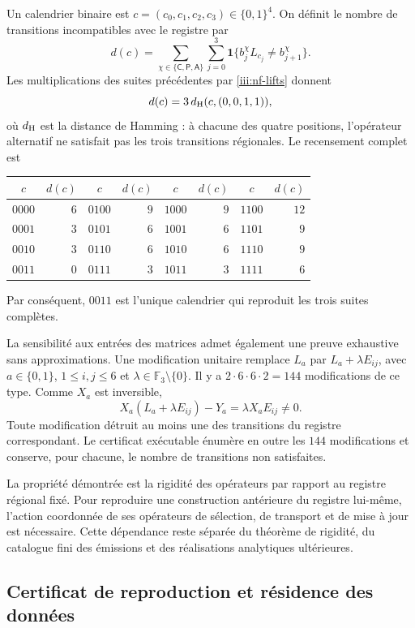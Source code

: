 Un calendrier binaire est $c=(c_0,c_1,c_2,c_3)\in\{0,1\}^4$.
On définit le nombre de transitions incompatibles avec le registre par
\begin{equation}
 d(c)=\sum_{\chi\in\{\mathsf C,\mathsf P,\mathsf A\}}
       \sum_{j=0}^{3}
       \mathbf1\{b_j^\chi L_{c_j}\ne b_{j+1}^\chi\}.
 \label{iii:nf-calendario}
\end{equation}
Les multiplications des suites précédentes par
\eqref{iii:nf-lifts} donnent
\[
 d(c)=3\,d_{\rm H}(c,(0,0,1,1)),
\]
où $d_{\rm H}$ est la distance de Hamming : à chacune des
quatre positions, l’opérateur alternatif ne satisfait pas les trois
transitions régionales. Le recensement complet est
\begin{center}
\begin{tabular}{cr@{\qquad}cr@{\qquad}cr@{\qquad}cr}
$c$&$d(c)$&$c$&$d(c)$&$c$&$d(c)$&$c$&$d(c)$\\ \hline
$0000$&$6$&$0100$&$9$&$1000$&$9$&$1100$&$12$\\
$0001$&$3$&$0101$&$6$&$1001$&$6$&$1101$&$9$\\
$0010$&$3$&$0110$&$6$&$1010$&$6$&$1110$&$9$\\
$0011$&$0$&$0111$&$3$&$1011$&$3$&$1111$&$6$
\end{tabular}
\end{center}
Par conséquent, $0011$ est l’unique calendrier qui reproduit les
trois suites complètes.

La sensibilité aux entrées des matrices admet également une
preuve exhaustive sans approximations. Une modification unitaire
remplace $L_a$ par $L_a+\lambda E_{ij}$, avec
$a\in\{0,1\}$, $1\le i,j\le6$ et
$\lambda\in\mathbb F_3\setminus\{0\}$. Il y a
$2\cdot6\cdot6\cdot2=144$ modifications de ce type. Comme
$X_a$ est inversible,
\[
 X_a(L_a+\lambda E_{ij})-Y_a
 =\lambda X_aE_{ij}\ne0.
\]
Toute modification détruit au moins une des transitions du
registre correspondant. Le certificat exécutable énumère en outre
les $144$ modifications et conserve, pour chacune, le nombre de
transitions non satisfaites.

La propriété démontrée est la rigidité des opérateurs par rapport au
registre régional fixé. Pour reproduire une construction antérieure
du registre lui-même, l’action coordonnée de ses opérateurs
de sélection, de transport et de mise à jour est nécessaire. Cette dépendance reste
séparée du théorème de rigidité, du catalogue fini des émissions et
des réalisations analytiques ultérieures.

\subsection{Certificat de reproduction et résidence des données}

